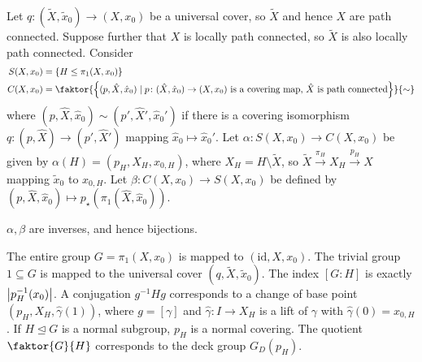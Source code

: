 Let \( q \colon (\widetilde X, \widetilde x_0) \to (X, x_0) \) be a universal cover, so \( \widetilde X \) and hence \( X \) are path connected.
Suppose further that \( X \) is locally path connected, so \( \widetilde X \) is also locally path connected.
Consider
\begin{align*}
	S(X,x_0) &= \qty{H \leq \pi_1(X,x_0)} \\
	C(X,x_0) &= \faktor{\qty{(p,\hat X, \hat x_0) \mid p \colon (\hat X, \hat x_0) \to (X,x_0) \text{ is a covering map, } \hat X \text{ is path connected}}}{\sim}
\end{align*}
where \( (p, \hat X, \hat x_0) \sim (p', \hat X', \hat x_0') \) if there is a covering isomorphism \( q \colon (p, \hat X) \to (p', \hat X') \) mapping \( \hat x_0 \mapsto \hat x_0' \).
Let \( \alpha \colon S(X,x_0) \to C(X,x_0) \) be given by \( \alpha(H) = (p_H, X_H, x_{0,H}) \), where \( X_H = H \setminus \widetilde X \), so \( \widetilde X \xrightarrow{\pi_H} X_H \xrightarrow{p_H} X \) mapping \( \widetilde x_0 \) to \( x_{0,H} \).
Let \( \beta \colon C(X,x_0) \to S(X,x_0) \) be defined by \( (p, \hat X, \hat x_0) \mapsto p_\star(\pi_1(\hat X, \hat x_0)) \).
\begin{theorem}
	\( \alpha, \beta \) are inverses, and hence bijections.
\end{theorem}
\begin{remark}
	The entire group \( G = \pi_1(X,x_0) \) is mapped to \( (\mathrm{id}, X, x_0) \).
	The trivial group \( 1 \subseteq G \) is mapped to the universal cover \( (q, \widetilde X, \widetilde x_0) \).
	The index \( [G : H] \) is exactly \( \abs{p_H^{-1}(x_0)} \).
	A conjugation \( g^{-1}Hg \) corresponds to a change of base point \( (p_H, X_H, \hat\gamma(1)) \), where \( g = [\gamma] \) and \( \hat\gamma \colon I \to X_H \) is a lift of \( \gamma \) with \( \hat\gamma(0) = x_{0,H} \).
	If \( H \trianglelefteq G \) is a normal subgroup, \( p_H \) is a normal covering.
	The quotient \( \faktor{G}{H} \) corresponds to the deck group \( G_D(p_H) \).
\end{remark}

